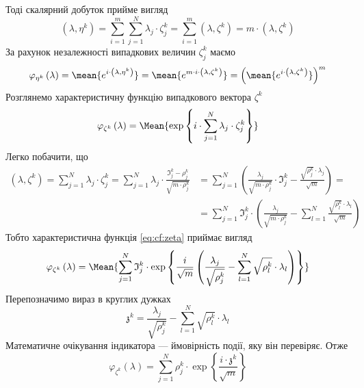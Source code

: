 Тоді скалярний добуток прийме вигляд
\begin{equation*}
    \left( \lambda, \eta^k \right)
    = \sum_{i=1}^{m} \sum_{j=1}^{N} \lambda_j \cdot \zeta_j^k
    = \sum_{i=1}^{m} \left( \lambda, \zeta^k \right)
    = m \cdot \left( \lambda, \zeta^k \right)
\end{equation*}
За рахунок незалежності випадкових величин $\zeta_j^k$ маємо
\begin{equation}\label{eq:cf:eta}
  \varphi_{\eta^k}\left( \lambda\right)
  = \mean{e^{i \cdot \left( \lambda, \eta^k \right)}}
  = \mean{e^{m \cdot i \cdot \left( \lambda, \zeta^k \right)}}
  = \left( \mean{e^{i \cdot \left( \lambda, \zeta^k \right)}} \right)^m
\end{equation}
Розглянемо характеристичну функцію випадкового вектора $\zeta^k$
\begin{equation}\label{eq:cf:zeta}
  \varphi_{\zeta^k}\left( \lambda \right)
  = \Mean{\exp{\left\{ i
    \cdot \sum_{j=1}^{N} \lambda_j \cdot \zeta_j^k \right\}}}
\end{equation}
Легко побачити, що
\begin{equation*}
  \begin{split}
    \left( \lambda, \zeta^k \right)
    = \sum_{j=1}^{N} \lambda_j \cdot \zeta_j^k
    = \sum_{j=1}^{N} \lambda_j
      \cdot \frac{\mathfrak{I}_j^k - \rho_j^k}{\sqrt{m \cdot \rho_j^k}}
    &= \sum_{j=1}^{N} \left(
       \frac{\lambda_j}{\sqrt{m \cdot \rho_j^k}} \cdot \mathfrak{I}_j^k
       - \frac{\sqrt{\rho_j^k} \cdot \lambda_j}{\sqrt{m}} \right) = \\
    &= \sum_{j=1}^{N} \mathfrak{I}_j^k \cdot \left( 
        \frac{\lambda_j}{\sqrt{m \cdot \rho_j^k}}
        - \sum_{l=1}^{N} \frac{\sqrt{\rho_l^k} \cdot \lambda_l}{\sqrt{m}}
      \right)
  \end{split}
\end{equation*}
Тобто характеристична функція \eqref{eq:cf:zeta} приймає вигляд
\begin{equation*}
  \varphi_{\zeta^k}\left( \lambda \right)
  = \Mean{\sum_{j=1}^{N} \mathfrak{I}_j^k
    \cdot \exp{\left\{ \frac{i}{\sqrt{m}} \left(
      \frac{\lambda_j}{\sqrt{\rho_j^k}}
      - \sum_{l=1}^{N} \sqrt{\rho_l^k} \cdot \lambda_l \right) \right\}}}
\end{equation*}
Перепозначимо вираз в круглих дужках
\begin{equation*}
  \mathfrak{z}^k
  = \frac{\lambda_j}{\sqrt{\rho_j^k}}
    - \sum_{l=1}^{N} \sqrt{\rho_l^k} \cdot \lambda_l
\end{equation*}
Математичне очікування індикатора --- ймовірність події, яку він перевіряє.
Отже
\begin{equation*}
  \varphi_{\zeta^k}\left( \lambda \right)
  = \sum_{j=1}^{N} \rho_j^k
    \cdot \exp{\left\{ \frac{i \cdot \mathfrak{z}^k}{\sqrt{m}} \right\}}
\end{equation*}

